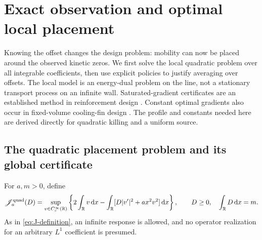 \section{Exact observation and optimal local placement}
\label{sec:exact-observation}
Knowing the offset changes the design problem: mobility can now be
placed around the observed kinetic zeros. We first solve the local
quadratic problem over all integrable coefficients, then use explicit
policies to justify averaging over offsets. The local model is an
energy-dual problem on the line, not a stationary transport process on
an infinite wall. Saturated-gradient certificates are an established
method in reinforcement design \citep{ButtazzoOudetVelichkov2015}.
Constant optimal gradients also occur in fixed-volume cooling-fin
design \citep{AlexandersenSigmund2021}. The profile and constants
needed here are derived directly for quadratic killing and a uniform
source.

\subsection{The quadratic placement problem and its global certificate}
For $a,m>0$, define
\begin{equation}\label{eq:placement-line}
 \mathscr J_a^{\rm quad}(D)=\sup_{v\in C_c^\infty(\mathbb R)}
 \left\{2\int_\mathbb R v\,\mathrm d x-\int_\mathbb R
                 [D|v'|^2+ax^2v^2]\,\mathrm d x\right\},
 \qquad D\ge0,\quad\int_\mathbb R D\,\mathrm d x=m.
\end{equation}
As in \eqref{eq:J-definition}, an infinite response is allowed, and
no operator realization for an arbitrary $L^1$ coefficient is presumed.


